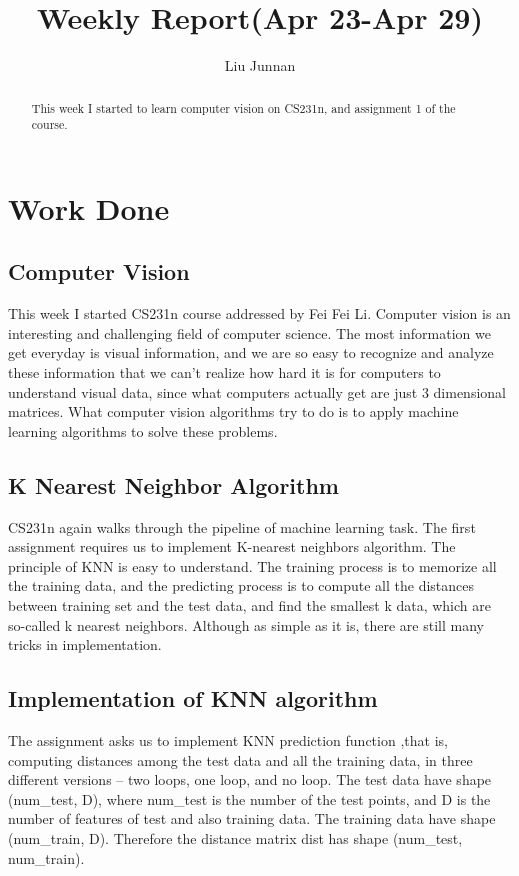 \documentclass{article} %
\title{Weekly Report(Apr 23-Apr 29)}
\author{
Liu Junnan
}
\begin{document}
\maketitle

\begin{abstract}
This week I started to learn computer vision on CS231n, and assignment 1 of the course.
\end{abstract}

\section{Work Done}
\subsection{Computer Vision}
This week I started CS231n course addressed by Fei Fei Li. Computer vision is an interesting and challenging field of computer science. The most information we get everyday is visual information, and we are so easy to recognize and analyze these information that we can't realize how hard it is for computers to understand visual data, since what computers actually get are just 3 dimensional matrices. What computer vision algorithms try to do is to apply machine learning algorithms to solve these problems.

\subsection{K Nearest Neighbor Algorithm}
CS231n again walks through the pipeline of machine learning task. The first assignment requires us to implement K-nearest neighbors algorithm. The principle of KNN is easy to understand. The training process is to memorize all the training data, and the predicting
process is to compute all the distances between training set and the test data, and find the smallest k data, which are so-called k nearest neighbors. Although as simple as it is, there are still many tricks in implementation.

\subsection{Implementation of KNN algorithm}
The assignment asks us to implement KNN prediction function ,that is, computing distances among the test data and all the training data, in three different versions -- two loops, one loop, and no loop. The test data have shape (num\_test, D), where num\_test is the number of the test points, and D is the number of features of test and also training data. The training data have shape (num\_train, D). Therefore the distance matrix dist has shape (num\_test, num\_train). 
\end{document}
